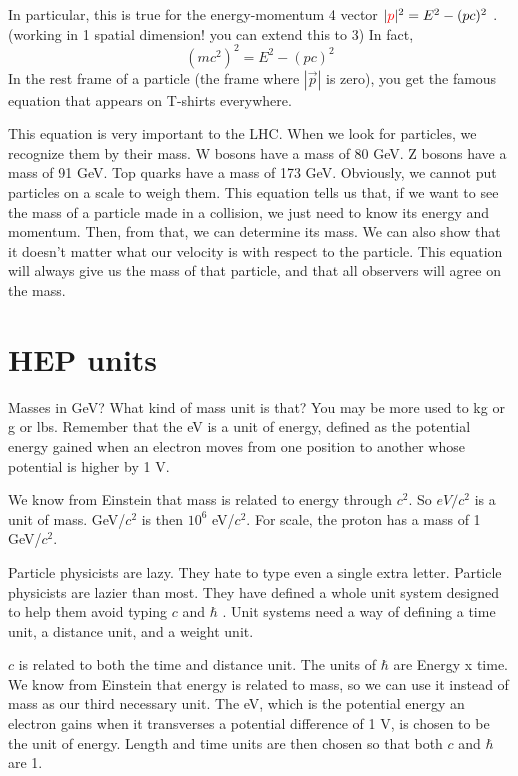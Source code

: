In particular, this is true for the energy-momentum 4 vector  $|{\color{red}p}|^2 = E^2 - (pc)^2$  . (working in 1 spatial dimension! you can extend this to 3)  In fact, 
\begin{equation}
	  	(mc^2)^2 = E^2 -(pc)^2
\end{equation}  
In the rest frame of a particle (the frame where  $|\vec p |$  is zero), you get the famous equation that appears on T-shirts everywhere.

This equation is very important to the LHC.  When we look for particles, we recognize them by their mass.  W bosons have a mass of 80 GeV.  Z bosons have a mass of 91 GeV.  Top quarks have a mass of 173 GeV.  Obviously, we cannot put particles on a scale to weigh them. This equation tells us that, if we want to see the mass of a particle made in a collision, we just need to know its energy and momentum.  Then, from that, we can determine its mass.  We can also show that it doesn't matter what our velocity is with respect to the particle.  This equation will always give us the mass of that particle, and that all observers will agree on the mass.

\section{HEP units}

Masses in GeV?  What kind of mass unit is that? You may be more used to kg or g or lbs.  Remember that the eV is a unit of energy, defined as the potential energy gained when an electron moves from one position to another whose potential is higher by 1 V.

We know from Einstein that mass is related to energy through $c^2$.  So $eV/c^2$ is a unit of mass.  GeV/$c^2$ is then $10^6$ eV/$c^2$.  For scale, the proton has a mass of 1 GeV/$c^2$.

Particle physicists are lazy.  They hate to type even a single extra letter.  Particle physicists are lazier than most.  They have defined a whole unit system designed to help them avoid typing $c$ and $\hbar$ .  Unit systems need a way of defining a time unit, a distance unit, and a weight unit.  

$c$ is related to both the time and distance unit.  The units of  $\hbar$ are Energy x time. We know from Einstein that energy is related to mass, so we can use it instead of mass as our third necessary unit.  The eV, which is the potential energy an electron gains when it transverses a potential difference of 1 V, is chosen to be the unit of energy. Length and time units are then chosen so that both $c$ and $\hbar$  are 1.  

